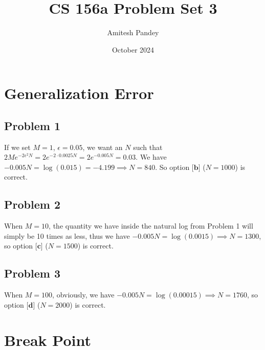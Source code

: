 \documentclass{article}
\title{CS 156a Problem Set 3}
\author{Amitesh Pandey}
\date{October 2024}
\begin{document}
\maketitle
\section*{Generalization Error}
\subsection*{Problem 1}
If we set $M = 1$, $\epsilon = 0.05$, we want an $N$ such that $2Me^{-2\epsilon^2 N} = 2e^{-2\cdot 0.0025N} = 2e^{-0.005N} = 0.03$. We have $-0.005N = \log{(0.015)} = -4.199 \implies N = 840$. So option $\textbf{[b]}$ ($N = 1000$) is correct.
\subsection*{Problem 2}
When $M = 10$, the quantity we have inside the natural log from Problem 1 will simply be 10 times as less, thus we have $-0.005N = \log{(0.0015)} \implies N  =1300$, so option $\textbf{[c]}$ ($N = 1500$) is correct.
\subsection*{Problem 3}
When $M = 100$, obviously, we have $-0.005N = \log{(0.00015)} \implies N = 1760$, so option $\textbf{[d]} $ ($N = 2000$) is correct.
\newpage
\section*{Break Point}
\end{document}
